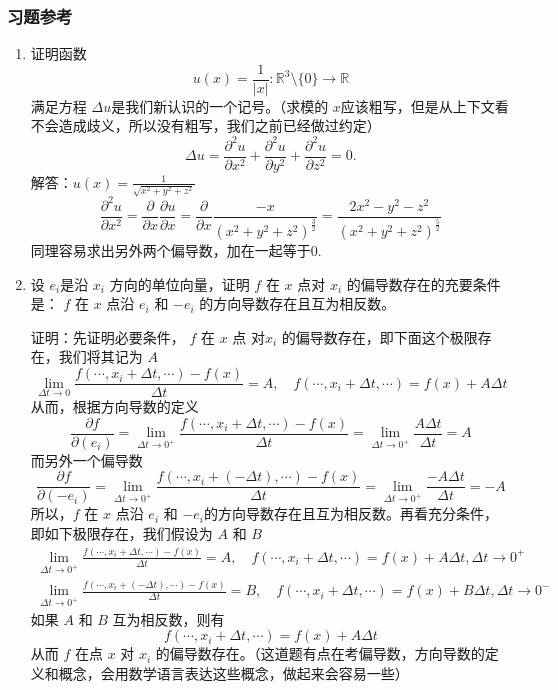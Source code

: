 \subsubsection{习题参考}
\begin{enumerate}
\item 证明函数
$$
u(x)=\frac1{|x|}:\mathbb{R}^3\setminus\{0\}\to\mathbb{R}
$$
满足方程 $\Delta u $是我们新认识的一个记号。（求模的 $x$应该粗写，但是从上下文看不会造成歧义，所以没有粗写，我们之前已经做过约定）
$$
\Delta u=\frac{\partial^2u}{\partial x^2}+\frac{\partial^2u}{\partial y^2}+\frac{\partial^2u}{\partial z^2}=0.
$$
解答：$u(x) = \frac{1}{\sqrt{x^2 + y^2 + z^2}}$
\begin{equation*}
    \frac{\partial^2 u}{\partial x^2} = \frac{\partial }{\partial x} \frac{\partial u}{\partial x} = \frac{\partial }{\partial x} \frac{-x}{(x^2 + y ^2 + z ^2)^{\frac{3}{2}}} = \frac{2x^2-y^2-z^2 }{(x^2+y^2+z^2)^\frac{5}{2}}
\end{equation*}
同理容易求出另外两个偏导数，加在一起等于0.

\item 设 $e_i$是沿 $x_i$ 方向的单位向量，证明 $f$ 在 $x$ 点对 $x_i$ 的偏导数存在的充要条件是： $f$ 在 $x$ 点沿 $e_i$ 和 $-e_i$ 的方向导数存在且互为相反数。

证明：先证明必要条件， $f$ 在 $x$ 点 对$x_i$ 的偏导数存在，即下面这个极限存在，我们将其记为 $A$
\begin{equation*}
    \lim _{\Delta t \to 0} \frac{f(\cdots, x_i + \Delta t,\cdots)-f(x)}{\Delta t} = A, \quad f(\cdots, x_i + \Delta t,\cdots) = f(x) + A \Delta t
\end{equation*}
从而，根据方向导数的定义
\begin{equation*}
   \frac{\partial f}{\partial (e_i)} = \lim _{\Delta t \to 0 ^+ } \frac{f(\cdots, x_i + \Delta t,\cdots)-f(x)}{\Delta t} =\lim _{\Delta t \to 0^+} \frac{A \Delta t}{\Delta t} =  A
\end{equation*}
而另外一个偏导数
\begin{equation*}
    \frac{\partial f}{\partial (-e_i)} = \lim _{\Delta t \to 0 ^+ } \frac{f(\cdots, x_i +( - \Delta t),\cdots)-f(x)}{\Delta t} = \lim _{\Delta t \to 0^+} \frac{-A \Delta t}{\Delta t} = -A
\end{equation*}
所以，$f$ 在 $x$ 点沿 $e_i$ 和 $-e_i$的方向导数存在且互为相反数。再看充分条件，即如下极限存在，我们假设为 $A$ 和 $B$
\begin{align*}
    \lim _{\Delta t \to 0 ^+ } \frac{f(\cdots, x_i +\Delta t,\cdots)-f(x)}{\Delta t} = A, \quad f(\cdots,x_i+\Delta t , \cdots) = f(x) + A \Delta t , \Delta t \to 0^+ \\
    \lim _{\Delta t \to 0 ^+ } \frac{f(\cdots, x_i +(- \Delta t),\cdots)-f(x)}{\Delta t} = B , \quad  f(\cdots,x_i+\Delta t , \cdots) = f(x) + B \Delta t , \Delta t \to 0^-
\end{align*}
如果 $A$ 和 $B$ 互为相反数，则有
\begin{equation*}
    f(\cdots,x_i+\Delta t , \cdots) = f(x) + A \Delta t
\end{equation*}
从而 $f$ 在点 $x$ 对 $x_i$ 的偏导数存在。（这道题有点在考偏导数，方向导数的定义和概念，会用数学语言表达这些概念，做起来会容易一些）


\end{enumerate}
